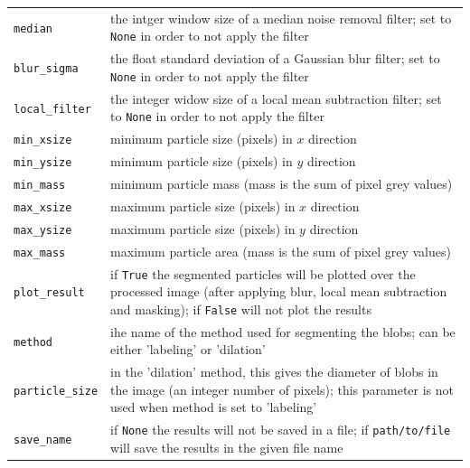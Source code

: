 \documentclass[10pt,a4paper]{article}
\begin{document}
\begin{table}[!ht]
\begin{tabular}{l m{10cm}}
		\texttt{median} & the intger window size of a median noise removal filter; set to \texttt{None} in order to not apply the filter \\[.3em]
		
		\texttt{blur\_sigma} & the float standard deviation of a Gaussian blur filter; set to \texttt{None} in order to not apply the filter \\[.3em]
		 
		\texttt{local\_filter} & the integer widow size of a local mean subtraction filter; set to \texttt{None} in order to not apply the filter \\[.3em]
		
		\texttt{min\_xsize} & minimum particle size (pixels) in $x$ direction \\[.3em]
		
		\texttt{min\_ysize} & minimum particle size (pixels) in $y$ direction \\[.3em]
		
		\texttt{min\_mass} & minimum particle mass (mass is the sum of pixel grey values)\\[.3em]
		
		\texttt{max\_xsize} & maximum particle size (pixels) in $x$ direction \\[.3em]
		
		\texttt{max\_ysize} & maximum particle size (pixels) in $y$ direction \\[.3em]
		
		\texttt{max\_mass} & maximum particle area (mass is the sum of pixel grey values) \\[.3em]

		\texttt{plot\_result} & if \texttt{True} the segmented particles will be plotted over the processed image (after applying blur, local mean subtraction and masking); if \texttt{False} will not plot the results \\[.3em]
		
		\texttt{method} & ihe name of the method used for segmenting the blobs; can be either 'labeling' or 'dilation' \\
		
		\texttt{particle\_size} & in the 'dilation' method, this gives the diameter of blobs in the image (an integer number of pixels); this parameter is not used when method is set to 'labeling' \\
		
		\texttt{save\_name} & if \texttt{None} the results will not be saved in a file; if \texttt{path/to/file} will save the results in the given file name \\
		
		\hline
	\end{tabular}
\end{table}
\end{document}
